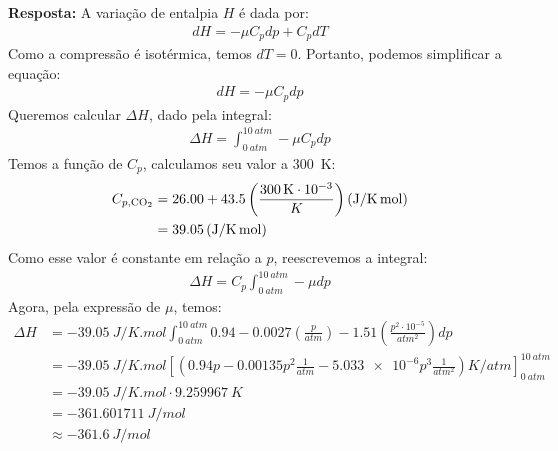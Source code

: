     \textbf{Resposta:} A variação de entalpia \( H \) é dada por:
    \begin{align*}
        dH = -\mu C_p dp + C_p dT
    \end{align*}
    Como a compressão é isotérmica, temos \( dT = 0 \). Portanto, podemos
    simplificar a equação:
    \begin{align*}
        dH = -\mu C_p dp
    \end{align*}
    Queremos calcular \( \Delta H \), dado pela integral:
    \begin{align*}
        \Delta H = \int_{\qty{0}{atm}}^{\qty{10}{atm}} -\mu C_p dp
    \end{align*}
    Temos a função de \( C_p \), calculamos seu valor a \qty{300}{K}:
    \begin{align*}
        C_{p, \ce{CO2}} &= \num{26.00} + \num{43.5} \left( \frac{\qty{300}{K}
            \cdot 10^{-3}}{K}
            \right) (\unit{J \per K . mol})\\
                        &= \num{39.05} \left( \unit{J \per K . mol} \right) 
    \end{align*}
    Como esse valor é constante em relação a \( p \), reescrevemos a integral:
    \begin{align*}
        \Delta H = C_p \int_{\qty{0}{atm}}^{\qty{10}{atm}} -\mu dp
    \end{align*}
    Agora, pela expressão de \( \mu \), temos:
    \begin{align*}
        \Delta H &= - \qty{39.05}{J \per K . mol}
                 \int_{\qty{0}{atm}}^{\qty{10}{atm}} \num{0.94} -
                 \num{0.0027} \left( \frac{p}{\unit{atm}} \right) - \num{1.51} \left(
                 \frac{p^2 \cdot 10^{-5}}{\unit{atm^2}} \right) dp\\
                 &= - \qty{39.05}{J \per K . mol} \left[ \left( \num{0.94}p -
                     \num{0.00135}p^2 \frac{1}{\unit{atm}} - \num{5.033e-6}p^3
                 \frac{1}{\unit{atm^2}} \right) \unit{K \per atm}
         \right]_{\qty{0}{atm}}^{\qty{10}{atm}}\\
                 &= - \qty{39.05}{J \per K . mol} \cdot \qty{9.259967}{K} \\
                 &= - \qty{361.601711}{J \per mol}\\
                 &\approx - \qty{361.6}{J \per mol}
    \end{align*}
    
